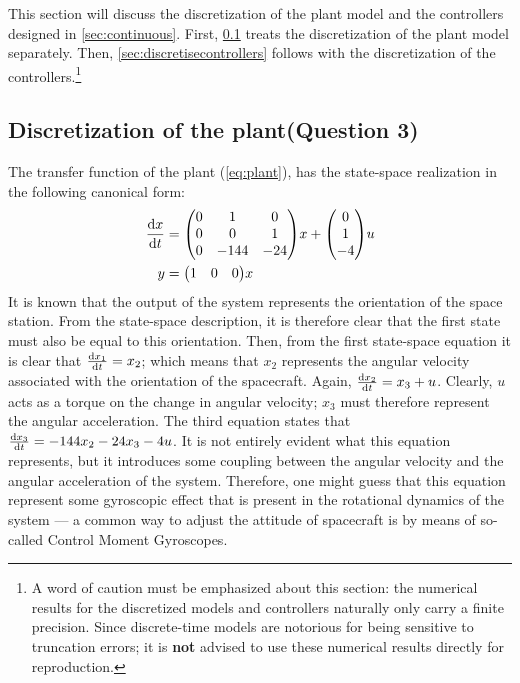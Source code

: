 This section will discuss the discretization of the plant model and the controllers designed in \cref{sec:continuous}. First, \cref{sec:plantdiscretisation} treats the discretization of the plant model separately. Then, \cref{sec:discretisecontrollers} follows with the discretization of the controllers.\footnote{A word of caution must be emphasized about this section: the numerical results for the discretized models and controllers naturally only carry a finite precision. Since discrete-time models are notorious for being sensitive to truncation errors; it is \textbf{not} advised to use these numerical results directly for reproduction.}

\subsection{Discretization of the plant\textnormal{\phantom{xxx}(Question 3)}}
\label{sec:plantdiscretisation}
The transfer function of the plant (\cref{eq:plant}), has the state-space realization in the following canonical form:
\begin{equation}
    \begin{aligned}
        \dv{x}{t} &= \mqty(0 & 1 & 0 \\ 0 & 0 & 1 \\ 0 & -144 & -24)x + \mqty(0 \\ 1 \\ -4)u\\
        y &= \mqty(1 & 0 & 0)x
    \end{aligned}
\end{equation}
It is known that the output of the system represents the orientation of the space station. From the state-space description, it is therefore clear that the first state must also be equal to this orientation. Then, from the first state-space equation it is clear that $\dv{x_1}{t} = x_2$; which means that $x_2$ represents the angular velocity associated with the orientation of the spacecraft. Again, $\dv{x_2}{t} = x_3 + u$. Clearly, $u$ acts as a torque on the change in angular velocity; $x_3$ must therefore represent the angular acceleration. The third equation states that $\dv{x_3}{t} = -144x_2 - 24x_3 -4u$. It is not entirely evident what this equation represents, but it introduces some coupling between the angular velocity and the angular acceleration of the system. Therefore, one might guess that this equation represent some gyroscopic effect that is present in the rotational dynamics of the system --- a common way to adjust the attitude of spacecraft is by means of so-called Control Moment Gyroscopes.

